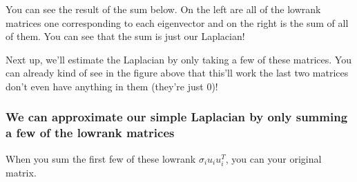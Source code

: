 \documentclass[letterpaper,10pt,english]{jupyterBook}
\begin{document}
\begin{sphinxVerbatim}[commandchars=\\\{\}]
  \PYG{p}{[}\PYG{p}{]}

  \PYG{p}{[}\PYG{p}{]}
   
      \PYG{p}{[} \PYG{p}{]}
      \PYG{p}{[} \PYG{p}{]}
      \PYG{p}{[}\PYG{p}{]}    
    
  
\end{sphinxVerbatim}

\sphinxAtStartPar
You can see the result of the sum below. On the left are all of the low\sphinxhyphen{}rank matrices \sphinxhyphen{} one corresponding to each eigenvector \sphinxhyphen{} and on the right is the sum of all of them. You can see that the sum is just our Laplacian!

\noindent{}

\sphinxAtStartPar
Next up, we’ll estimate the Laplacian by only taking a few of these matrices. You can already kind of see in the figure above that this’ll work \sphinxhyphen{} the last two matrices don’t even have anything in them (they’re just 0)!


\subsubsection{We can approximate our simple Laplacian by only summing a few of the low\sphinxhyphen{}rank matrices}
\label{\detokenize{representations/ch6/spectral-embedding:we-can-approximate-our-simple-laplacian-by-only-summing-a-few-of-the-low-rank-matrices}}
\sphinxAtStartPar
When you sum the first few of these low\sphinxhyphen{}rank \(\sigma_i u_i u_i^T\), you can  your original matrix.
\end{document}
